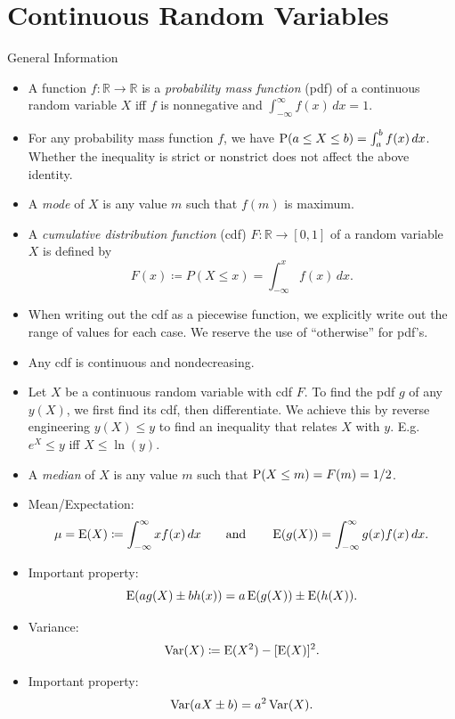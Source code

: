 \documentclass[../Notes.tex]{subfiles}
\begin{document}
\chapter{Continuous Random Variables}
\begin{stbox}{General Information}
  \begin{itemize}
    \item A function \(f \colon \mathbb{R}\to \mathbb{R}\) is a \emph{probability mass function} (pdf) of a continuous random variable \(X\) iff \(f\) is nonnegative and \(\int_{-\infty}^{\infty}f(x)\,dx=1\).
    \item For any probability mass function \(f\), we have \(\operatorname{P}(a\leq X\leq b)=\int_{a}^{b}f(x)\,dx\). Whether the inequality is strict or nonstrict does not affect the above identity. 
    \item A \emph{mode} of \(X\) is any value \(m\) such that \(f(m)\) is maximum.
    \item A \emph{cumulative distribution function} (cdf) \(F \colon \mathbb{R}\to [0,1]\) of a random variable \(X\) is defined by
    \[F(x)\coloneq P(X\leq x)=\int_{-\infty}^{x}f(x)\,dx.\]
    \item When writing out the cdf as a piecewise function, we explicitly write out the range of values for each case. We reserve the use of ``otherwise'' for pdf's.
    \item Any cdf is continuous and nondecreasing.
    \item Let \(X\) be a continuous random variable with cdf \(F\). To find the pdf \(g\) of any \(y(X)\), we first find its cdf, then differentiate. We achieve this by reverse engineering \(y(X)\leq y\) to find an inequality that relates \(X\) with \(y\). E.g. \(e^X\leq y\) iff \(X\leq \ln(y)\).
    \item A \emph{median} of \(X\) is any value \(m\) such that \(\operatorname{P}(X\leq m)=F(m)=1/2\).
    \item Mean/Expectation: 
    \[\mu=\operatorname{E}(X)\coloneq \int_{-\infty}^{\infty}xf(x)\,dx \qquad\text{and}\qquad \operatorname{E}(g(X))=\int_{-\infty}^{\infty}g(x)f(x)\,dx.\]
    \item Important property: 
    \[\operatorname{E}(ag(X)\pm bh(x))=a\operatorname{E}(g(X))\pm\operatorname{E}(h(X)).\]
    \item Variance: 
    \[\operatorname{Var}(X)\coloneq \operatorname{E}(X^2)-[\operatorname{E}(X)]^2.\]
    \item Important property:
    \[\operatorname{Var}(aX\pm b)=a^2\operatorname{Var}(X).\]
  \end{itemize}
\end{stbox}
\end{document}
